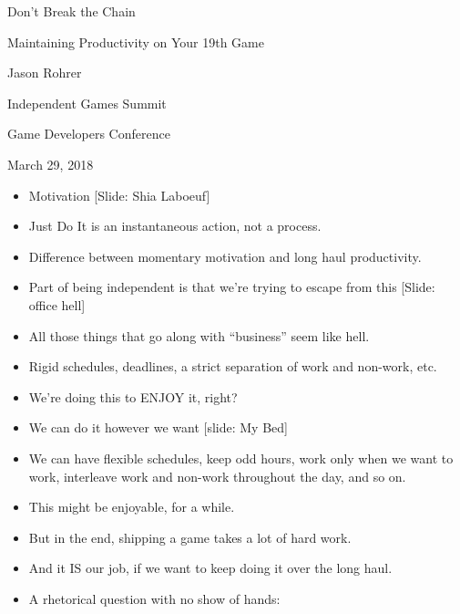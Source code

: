 \documentclass[12pt]{article}
\begin{document}
\begin{center}
Don't Break the Chain

Maintaining Productivity on Your 19th Game 

Jason Rohrer

Independent Games Summit

Game Developers Conference 

March 29, 2018
\end{center}


{\Huge



\begin{itemize}

\item Motivation [Slide:  Shia Laboeuf]

\item Just Do It is an instantaneous action, not a process.

\item Difference between momentary motivation and long haul productivity.

\item Part of being independent is that we're trying to escape from this [Slide:  office hell]

\item All those things that go along with ``business'' seem like hell.

\item Rigid schedules, deadlines, a strict separation of work and non-work, etc.

\item We're doing this to ENJOY it, right?

\item We can do it however we want [slide:  My Bed]

\item We can have flexible schedules, keep odd hours, work only when we want to work, interleave work and non-work throughout the day, and so on.

\item This might be enjoyable, for a while.

\item But in the end, shipping a game takes a lot of hard work.

\item And it IS our job, if we want to keep doing it over the long haul.

\item A rhetorical question with no show of hands:


\end{itemize}}
\end{document}
